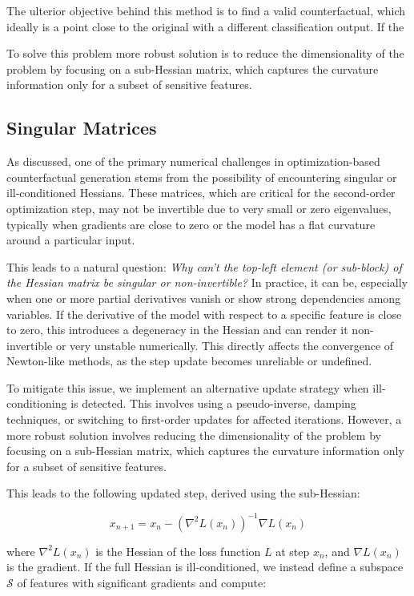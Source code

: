 \documentclass[12pt]{extarticle}
\numberwithin{equation}{section}
\begin{document}
The ulterior objective behind this method is to find a valid counterfactual, which ideally is a point close to the original with a different classification output. If the 

To solve this problem more robust solution is to reduce the dimensionality of the problem by focusing on a sub-Hessian matrix, which captures the curvature information only for a subset of sensitive features.


\subsection{Singular Matrices}

As discussed, one of the primary numerical challenges in optimization-based counterfactual generation stems from the possibility of encountering singular or ill-conditioned Hessians. These matrices, which are critical for the second-order optimization step, may not be invertible due to very small or zero eigenvalues, typically when gradients are close to zero or the model has a flat curvature around a particular input.

This leads to a natural question: \textit{Why can't the top-left element (or sub-block) of the Hessian matrix be singular or non-invertible?} In practice, it can be, especially when one or more partial derivatives vanish or show strong dependencies among variables. If the derivative of the model with respect to a specific feature is close to zero, this introduces a degeneracy in the Hessian and can render it non-invertible or very unstable numerically. This directly affects the convergence of Newton-like methods, as the step update becomes unreliable or undefined.

To mitigate this issue, we implement an alternative update strategy when ill-conditioning is detected. This involves using a pseudo-inverse, damping techniques, or switching to first-order updates for affected iterations. However, a more robust solution involves reducing the dimensionality of the problem by focusing on a sub-Hessian matrix, which captures the curvature information only for a subset of sensitive features.

This leads to the following updated step, derived using the sub-Hessian:

\[
x_{n+1} = x_n - \left( \nabla^2 L(x_n) \right)^{-1} \nabla L(x_n)
\]

where \( \nabla^2 L(x_n) \) is the Hessian of the loss function \( L \) at step \( x_n \), and \( \nabla L(x_n) \) is the gradient. If the full Hessian is ill-conditioned, we instead define a subspace \( \mathcal{S} \) of features with significant gradients and compute:
\end{document}
